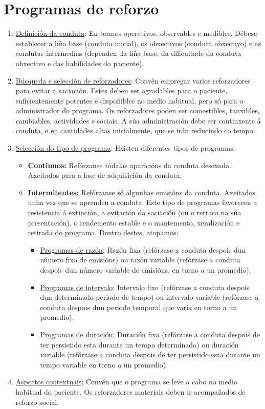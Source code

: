 \documentclass[a4paper,11pt]{article}
\begin{document}
\section{Programas de reforzo}
\begin{enumerate}
	\item \underline{Definición da conduta}: En termos operativos, observables e medibles. Débese 
	establecer a liña base (conduta inicial), os obxectivos (conduta obxectivo) e as condutas 
	intermedias (dependen da liña base, da dificultade da conduta obxectivo e das habilidades do 
	paciente).
	\item \underline{Búsqueda e selección de reforzadores}: Convén empregar varios reforzadores para 
	evitar a saciación. Estes deben ser agradables para o paciente, suficientemente potentes e 
	dispoñibles no medio habitual, pero só para o administrador do programa. Os reforzadores poden 
	ser comestibles, tanxibles, cambiables, actividades e sociais. A súa administración debe ser 
	continxente á conduta, e en cantidades altas inicialmente, que se irán reducindo co tempo.
	\item \underline{Selección do tipo de programa}: Existen diferentes tipos de programas.
	\begin{itemize}
		\item \textbf{Continuos:} Refórzanse tódalas aparicións da conduta desexada. Axeitados para 
		a fase de adquisición da conduta.
		\item \textbf{Intermitentes:} Refórzanse só algunhas emisións da conduta. Axeitados unha vez 
		que se aprendeu a conduta. Este tipo de programas favorecen a resistencia á extinción, a 
		evitación da saciación (ou o retraso na súa presentación), o rendemento estable e o 
		mantemento, xeralización e retirada do programa. Dentro destes, atopamos:
		\begin{itemize}
			\item \underline{Programas de razón}: Razón fixa (refórzase a conduta despois dun número 
			fixo de emisións) ou razón variable (refórzase a conduta despois dun número variable de 
			emisións, en torno a un promedio).
			\item \underline{Programas de intervalo}: Intervalo fixo (refórzase a conduta despois dun 
			determinado periodo de tempo) ou intervalo variable (refórzase a conduta despois dun 
			periodo temporal que varía en torno a un promedio). 
			\item \underline{Programas de duración}: Duración fixa (refórzase a conduta despois de 
			ter persistido esta durante un tempo determinado) ou duración variable (refórzase a 
			conduta despois de ter persistido esta durante un tempo variable en torno a un promedio).
		\end{itemize}
	\end{itemize}
	\item \underline{Aspectos contextuais}: Convén que o programa se leve a cabo no medio habitual do 
	paciente. Os reforzadores materiais deben ir acompañados de reforzo social. 
\end{enumerate}
\end{document}

